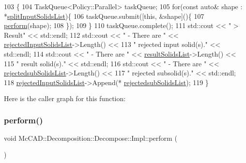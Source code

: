 \begin{DoxyCode}
103                                         \{
104     TaskQueue<Policy::Parallel> taskQueue;
105     \textcolor{keywordflow}{for}(\textcolor{keyword}{const} \textcolor{keyword}{auto}& shape : *\hyperlink{classMcCAD_1_1Decomposition_1_1Decompose_1_1Impl_a9da06719a71fdc8438190a3c3112e82b}{splitInputSolidsList})\{
106         taskQueue.submit([\textcolor{keyword}{this}, &shape]()\{
107             \hyperlink{classMcCAD_1_1Decomposition_1_1Decompose_1_1Impl_a71700a5c5ec1eaa1b414cb232d1a073b}{perform}(shape);
108         \});
109     \}
110     taskQueue.complete();
111     std::cout << \textcolor{stringliteral}{" > Result"} << std::endl;
112     std::cout << \textcolor{stringliteral}{"   - There are "} << \hyperlink{classMcCAD_1_1Decomposition_1_1Decompose_1_1Impl_afa4c71b9552009320911095b0e9c638e}{rejectedInputSolidsList}->Length() <<
113                  \textcolor{stringliteral}{" rejected input solid(s)."} << std::endl;
114     std::cout << \textcolor{stringliteral}{"   - There are "} << \hyperlink{classMcCAD_1_1Decomposition_1_1Decompose_1_1Impl_a75b53d768ed797dff26c6bf7308f0bea}{resultSolidsList}->Length() <<
115                  \textcolor{stringliteral}{" result solid(s)."} << std::endl;
116     std::cout << \textcolor{stringliteral}{"   - There are "} << \hyperlink{classMcCAD_1_1Decomposition_1_1Decompose_1_1Impl_a513935cebc47e2e4dd599963bfbb8008}{rejectedsubSolidsList}->Length() <<
117                  \textcolor{stringliteral}{" rejected subsolid(s)."} << std::endl;
118     \hyperlink{classMcCAD_1_1Decomposition_1_1Decompose_1_1Impl_afa4c71b9552009320911095b0e9c638e}{rejectedInputSolidsList}->Append(*
      \hyperlink{classMcCAD_1_1Decomposition_1_1Decompose_1_1Impl_a513935cebc47e2e4dd599963bfbb8008}{rejectedsubSolidsList});
119 \}
\end{DoxyCode}
Here is the caller graph for this function\+:
\mbox{\label{classMcCAD_1_1Decomposition_1_1Decompose_1_1Impl_a71700a5c5ec1eaa1b414cb232d1a073b}} 
\subsubsection{\texorpdfstring{perform()}{perform()}\hspace{0.1cm}{\footnotesize\ttfamily [4/4]}}
{\footnotesize\ttfamily void Mc\+C\+A\+D\+::\+Decomposition\+::\+Decompose\+::\+Impl\+::perform (\begin{DoxyParamCaption}{ }\end{DoxyParamCaption})}



